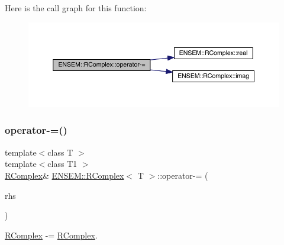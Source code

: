 Here is the call graph for this function\+:
\nopagebreak
\begin{figure}[H]
\begin{center}
\leavevmode
\includegraphics[width=350pt]{d9/d0e/classENSEM_1_1RComplex_aa2ad7391f0a0df5381ae7402b8b1fdb8_cgraph}
\end{center}
\end{figure}
\mbox{\label{classENSEM_1_1RComplex_aa2ad7391f0a0df5381ae7402b8b1fdb8}} 
\subsubsection{\texorpdfstring{operator-\/=()}{operator-=()}\hspace{0.1cm}{\footnotesize\ttfamily [5/6]}}
{\footnotesize\ttfamily template$<$class T $>$ \\
template$<$class T1 $>$ \\
\mbox{\hyperlink{classENSEM_1_1RComplex}{R\+Complex}}\& \mbox{\hyperlink{classENSEM_1_1RComplex}{E\+N\+S\+E\+M\+::\+R\+Complex}}$<$ T $>$\+::operator-\/= (\begin{DoxyParamCaption}\item[{const \mbox{\hyperlink{classENSEM_1_1RComplex}{R\+Complex}}$<$ T1 $>$ \&}]{rhs }\end{DoxyParamCaption})\hspace{0.3cm}{\ttfamily [inline]}}



\mbox{\hyperlink{classENSEM_1_1RComplex}{R\+Complex}} -\/= \mbox{\hyperlink{classENSEM_1_1RComplex}{R\+Complex}}. 

